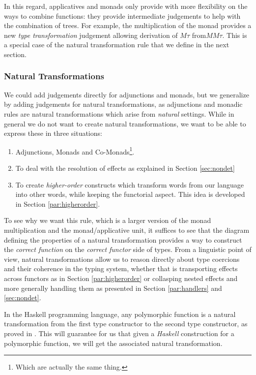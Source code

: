 \smallskip

In this regard, applicatives and monads only provide with more flexibility on
the ways to combine functions:
they provide intermediate judgements to help with the combination of trees.
For example, the multiplication of the monad provides a new \emph{type
	transformation} judgement allowing derivation of $M\tau$ from$MM\tau$.
This is a special case of the natural transformation rule that we
define in the next section.

\subsubsection{Natural Transformations}
We could add judgements directly for adjunctions and monads, but we generalize
by adding judgements for natural transformations, as adjunctions and monadic
rules are natural transformations which arise from \emph{natural} settings.
While in general we do not want to create natural transformations, we want to be
able to express these in three situations:
\begin{enumerate}
	\item Adjunctions, Monads and Co-Monads\footnote{Which are actually the same
		      thing.}.
	\item To deal with the resolution of effects as explained in Section
	      \ref{sec:nondet}
	\item To create \emph{higher-order} constructs which transform words from our
	      language into other words, while keeping the functorial aspect.
	      This idea is developed in Section \ref{par:higherorder}.
\end{enumerate}
To see why we want this rule, which is a larger version of the monad
multiplication and the monad/applicative unit, it suffices to see that the
diagram defining the properties of a natural transformation provides a way
to construct the \emph{correct function} on the \emph{correct functor} side of
types.
From a linguistic point of view, natural transformations allow us to reason
directly about type coercions and their coherence in the typing system,
whether that is transporting effects across functors as in Section
\ref{par:higherorder} or collasping nested effects and more generally handling
them as presented in Section \ref{par:handlers} and \ref{sec:nondet}.

\smallskip

In the Haskell programming language, any polymorphic function is
a natural transformation from the first type constructor to the second type
constructor, as proved in \cite{wadlerTheoremsFree1989}.
This will guarantee for us that given a \emph{Haskell} construction for a
polymorphic function, we will get the associated natural transformation.

